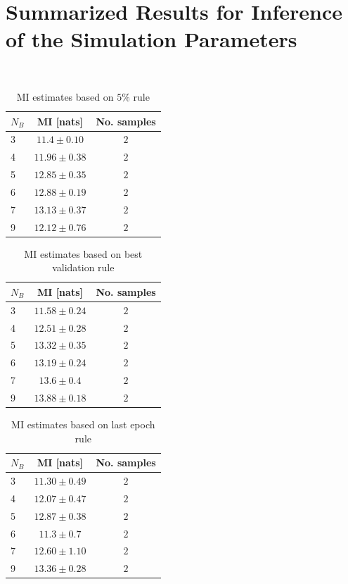 \section{Summarized Results for Inference of the Simulation Parameters}~\label{appendix2}

\begin{table}[htbp]
\centering
\caption{MI estimates based on $5\%$ rule}
\begin{tabular}{l |c |c}
\toprule
$N_B$ & MI [nats] & No. samples\\
\midrule
3 & $11.4 \pm 0.10$ & $2$ \\
4 & $11.96 \pm 0.38$ & $2$ \\
5 & $12.85 \pm 0.35$ & $2$ \\
6 & $12.88 \pm 0.19$ & $2$ \\
7 & $13.13 \pm 0.37$ & $2$ \\
9 & $12.12 \pm 0.76$ & $2$ \\

\bottomrule
\end{tabular}
\end{table}

\begin{table}[htbp]
\centering
\caption{MI estimates based on best validation rule}
\begin{tabular}{l |c |c}
\toprule
$N_B$ & MI [nats] & No. samples\\
\midrule
3 & $11.58 \pm 0.24$ & $2$ \\
4 & $12.51 \pm 0.28$ & $2$ \\
5 & $13.32 \pm 0.35$ & $2$ \\
6 & $13.19 \pm 0.24$ & $2$ \\
7 & $13.6 \pm 0.4$ & $2$ \\
9 & $13.88 \pm 0.18$ & $2$ \\

\bottomrule
\end{tabular}
\end{table}

\begin{table}[htbp]
\centering
\caption{MI estimates based on last epoch rule}
\begin{tabular}{l |c |c}
\toprule
$N_B$ & MI [nats] & No. samples\\
\midrule
3 & $11.30 \pm 0.49$ & $2$ \\
4 & $12.07 \pm 0.47$ & $2$ \\
5 & $12.87 \pm 0.38$ & $2$ \\
6 & $11.3 \pm 0.7$ & $2$ \\
7 & $12.60 \pm 1.10$ & $2$ \\
9 & $13.36 \pm 0.28$ & $2$ \\

\bottomrule
\end{tabular}
\end{table}